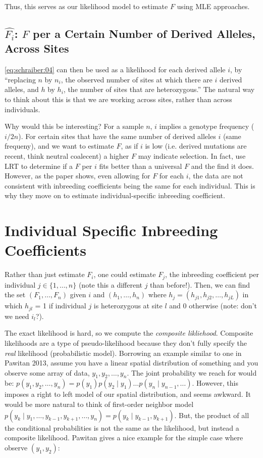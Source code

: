\documentclass[12pt]{article}\usepackage[]{graphicx}\usepackage[]{color}
\begin{document}
Thus, this serves as our likelihood model to estimate $F$ using MLE
approaches.

\subsection{$\hat{F_i}$: $F$ per a Certain Number of Derived Alleles, Across Sites}

\autoref{eq:schraiber:04} can then be used as a likelihood for each
derived allele $i$, by ``replacing $n$ by $n_i$, the observed number
of sites at which there are $i$ derived alleles, and $h$ by $h_i$, the
number of sites that are heterozygous.'' The natural way to think
about this is that we are working across sites, rather than
across individuals.

Why would this be interesting? For a sample $n$, $i$ implies a
genotype frequency ($i/2n$). For certain sites that have the same
number of derived alleles $i$ (same frequeny), and we want to estimate
$F$, as if $i$ is low (i.e. derived mutations are recent, think
neutral coalecent) a higher $F$ may indicate selection. In fact,
\citet{Schraiber:2012it} use LRT to determine if a $F$ per $i$ fits
better than a universal $F$ and the find it does. However, as the
paper shows, even allowing for $F$ for each $i$, the data are not
consistent with inbreeding coefficients being the same for each
individual. This is why they move on to estimate individual-specific
inbreeding coefficient.

\section{Individual Specific Inbreeding Coefficients}

Rather than just estimate $F_i$, one could estimate $F_j$, the
inbreeding coefficient per individual $j \in \{1, \ldots, n\}$ (note
this a different $j$ than before!). Then, we can find the set $(F_1,
\ldots, F_n)$ given $i$ and $(h_1, \ldots, h_n)$ where $h_j = (h_{j1},
h_{j2}, \ldots, h_{jL})$ in which $h_{jl}$ = 1 if individual $j$ is
heterozygous at site $l$ and 0 otherwise (note: don't we need $i_l$?).

The exact likelihood is hard, so we compute the \emph{composite 
likliehood}. Composite likelihoods are a type of pseudo-likelihood
because they don't fully specify the \emph{real} likelihood
(probabilistic model). Borrowing an example similar to one in Pawitan
2013, assume you have a linear spatial distribution of something and
you observe some array of data, $y_1, y_2, \ldots, y_n$. The joint
probability we reach for would be: $p(y_1, y_2, \ldots, y_n) = p(y_1)
p(y_2 \mid y_1) \ldots p(y_n \mid y_{n-1}, \ldots)$. However, this
imposes a right to left model of our spatial distribution, and seems
awkward. It would be more natural to think of first-order neighbor
model $p(y_k \mid y_1, \ldots, y_{k-1}, y_{k+1}, \ldots, y_n) = p(y_k
\mid y_{k-1}, y_{k+1})$. But, the product of all the conditional
probabilities is not the same as the likelihood, but instead a
composite likelihood. Pawitan gives a nice example for the simple case
where observe $(y_1, y_2)$:
\end{document}
